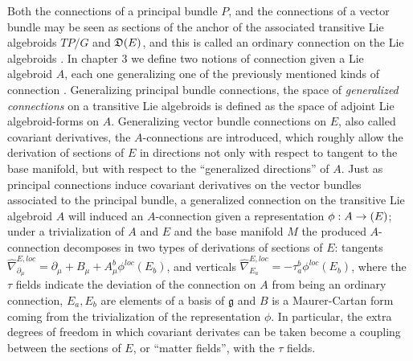Both the connections of a principal bundle $P$, and the connections of a vector bundle may be seen as sections of the anchor of the associated transitive Lie algebroids $TP/G$ and $\mathfrak{D}(E)$, and this is called an ordinary connection on the Lie algebroids \cite{Mackenzie2005}. In chapter $3$ we define two notions of connection given a Lie algebroid $A$, each one generalizing one of the previously mentioned kinds of connection \cite{Lazzarini2012}. Generalizing principal bundle connections, the space of \textit{generalized connections} on a transitive Lie algebroids is defined as the space of adjoint Lie algebroid-forms on $A$. Generalizing vector bundle connections on $E$, also called covariant derivatives, the $A$-connections are introduced, which roughly allow the derivation of sections of $E$ in directions not only with respect to tangent to the base manifold, but with respect to the ``generalized directions'' of $A$. Just as principal connections induce covariant derivatives on the vector bundles associated to the principal bundle, a generalized connection on the transitive Lie algebroid $A$ will induced an $A$-connection given a representation $\phi:A \to \alg(E)$; under a trivialization of $A$ and $E$ and the base manifold $M$ the produced $A$-connection decomposes in two types of derivations of sections of $E$: tangents $\hat \nabla^{E, loc}_{\partial_\mu} = \partial_\mu + B_\mu + A^b_\mu \phi^{loc}(E_b)$, and verticals $\hat \nabla^{E, loc}_{E_a} = - \tau^b_a \phi^{loc} (E_b)$, where the $\tau$ fields indicate the deviation of the connection on $A$ from being an ordinary connection, $E_a, E_b$ are elements of a basis of $\mathfrak g$ and $B$ is a Maurer-Cartan form coming from the trivialization of the representation $\phi$. In particular, the extra degrees of freedom in which covariant derivates can be taken become a coupling between the sections of $E$, or ``matter fields'', with the $\tau$ fields. 

